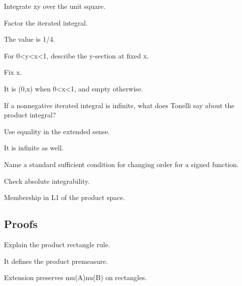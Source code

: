 \begin{exercise}\label{exr:iii05-expand-02}
Integrate xy over the unit square.
\end{exercise}
\begin{hint}
Factor the iterated integral.
\end{hint}
\begin{solution}
The value is 1/4.
\end{solution}

\begin{exercise}[Section]\label{exr:iii05-expand-03}
For 0<y<x<1, describe the y-section at fixed x.
\end{exercise}
\begin{hint}
Fix x.
\end{hint}
\begin{solution}
It is (0,x) when 0<x<1, and empty otherwise.
\end{solution}

\begin{exercise}\label{exr:iii05-expand-04}
If a nonnegative iterated integral is infinite, what does Tonelli say about the product integral?
\end{exercise}
\begin{hint}
Use equality in the extended sense.
\end{hint}
\begin{solution}
It is infinite as well.
\end{solution}

\begin{exercise}\label{exr:iii05-expand-05}
Name a standard sufficient condition for changing order for a signed function.
\end{exercise}
\begin{hint}
Check absolute integrability.
\end{hint}
\begin{solution}
Membership in L1 of the product space.
\end{solution}

\subsection*{Proofs}

\begin{exercise}\label{exr:iii05-expand-06}
Explain the product rectangle rule.
\end{exercise}
\begin{hint}
It defines the product premeasure.
\end{hint}
\begin{solution}
Extension preserves mu(A)nu(B) on rectangles.
\end{solution}

